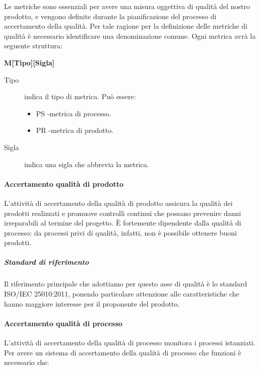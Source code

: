 \documentclass[../../norme-di-progetto.tex]{subfiles}
\begin{document}
Le metriche sono essenziali per avere una misura oggettiva di qualità del nostro prodotto, e vengono definite durante la pianificazione del processo di accertamento della qualità.
Per tale ragione per la definizione delle metriche di qualità è necessario identificare una denominazione comune.
Ogni metrica avrà la seguente struttura:
\begin{center}
  \textbf{M[Tipo][Sigla]}
\end{center}
\begin{description}
  \item [Tipo] indica il tipo di metrica. Può essere:
        \begin{itemize}
          \item PS -metrica di processo.
          \item PR -metrica di prodotto.
        \end{itemize}
  \item [Sigla] indica una sigla che abbrevia la metrica.
\end{description}

\paragraph{Accertamento qualità di prodotto}%
\label{par:accertamento_qualita_di_prodotto}
L'attività di accertamento della qualità di prodotto assicura la qualità dei prodotti realizzati e promuove controlli continui che possano prevenire danni irreparabili al termine del progetto.
È fortemente dipendente dalla qualità di processo: da processi privi di qualità, infatti, non è possibile ottenere buoni prodotti.

\subparagraph{Standard di riferimento}%
\label{subp:accertamento_qualita_di_prodotto/standard_di_riferimento}

Il riferimento principale che adottiamo per questo asse di qualità è lo standard ISO/IEC 25010:2011, ponendo particolare attenzione alle caratteristiche che hanno maggiore interesse per il proponente del prodotto.

\paragraph{Accertamento qualità di processo}%
\label{par:accertamento_qualita_di_processo}
L'attività di accertamento della qualità di processo monitora i processi istanziati. Per avere un sistema di accertamento della qualità di processo che funzioni è necessario che:
\end{document}
